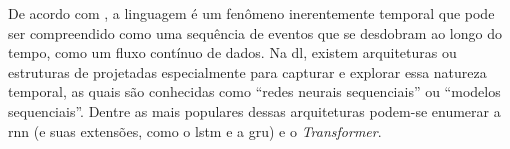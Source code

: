 








De acordo com , a linguagem é um fenômeno inerentemente temporal que pode ser compreendido como uma sequência de eventos que se desdobram ao longo do tempo, como um fluxo contínuo de dados.
Na \acrlong{dl}, existem arquiteturas ou estruturas de  projetadas especialmente para capturar e explorar essa natureza temporal, as quais são conhecidas como ``redes neurais sequenciais'' ou ``modelos sequenciais''.
Dentre as mais populares dessas arquiteturas podem-se enumerar a \acrfull{rnn} (e suas extensões, como o \acrfull{lstm} e a \acrfull{gru}) e o \textit{Transformer}.


